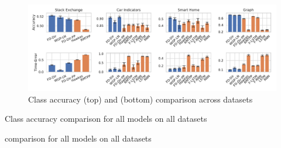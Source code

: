 \begin{figure}[H]
\centering
    \includegraphics[width=\linewidth]{sections/010_neurips2019/paper/images/accuracy-final-all.pdf}
    \caption{Class accuracy (top) and \TimeScore (bottom) comparison across datasets}
    \label{fig:all_results}
\end{figure}

\begin{table}
    \centering
    \caption{Class accuracy comparison for all models on all datasets}\label{table:accuracy}
    
\end{table}
\begin{table}
    \centering
    \caption{\TimeScore comparison for all models on all datasets}\label{table:time_error}
    
\end{table}




